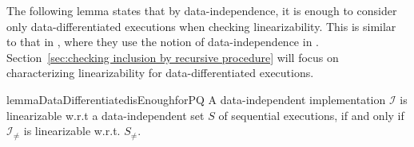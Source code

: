 The following lemma states that by data-independence, it is enough to consider only data-differentiated executions when checking linearizability. This is similar to that in \cite{conf/tacas/AbdullaHHJR13,DBLP:conf/icalp/BouajjaniEEH15}, where they use the notion of data-independence in \cite{conf/popl/Wolper86}.
Section~\ref{sec:checking inclusion by recursive procedure} will focus on characterizing linearizability for data-differentiated executions. %

\begin{restatable}{lemma}{DataDifferentiatedisEnoughforPQ}
\label{lemma:data differentiated is enough for PQ}
A data-independent implementation $\mathcal{I}$ is linearizable w.r.t a data-independent set $S$ of sequential executions, if and only if $\mathcal{I}_{\neq}$ is linearizable w.r.t. $S_{\neq}$.
\end{restatable}


